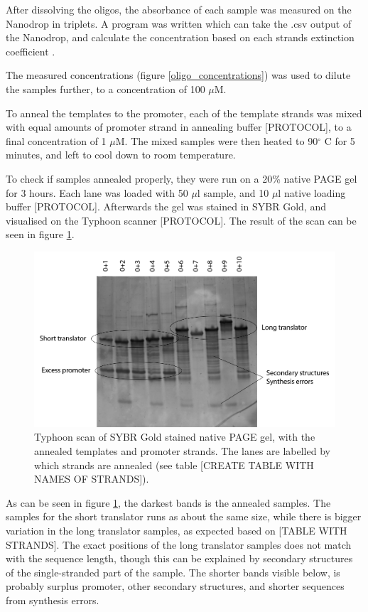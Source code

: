 After dissolving the oligos, the absorbance of each sample was measured on the Nanodrop in triplets. A program was written which can take the .csv output of the Nanodrop, and calculate the concentration based on each strands extinction coefficient \cite{nanodropimport}.

The measured concentrations (figure \ref{oligo_concentrations}) was used to dilute the samples further, to a concentration of 100 $\mu$M.

To anneal the templates to the promoter, each of the template strands was mixed with equal amounts of promoter strand in annealing buffer [PROTOCOL], to a final concentration of 1 $\mu$M. The mixed samples were then heated to 90$^\circ$ C for 5 minutes, and left to cool down to room temperature.

To check if samples annealed properly, they were run on a 20\% native PAGE gel for 3 hours. Each lane was loaded with 50 $\mu$l sample, and 10 $\mu$l native loading buffer [PROTOCOL]. Afterwards the gel was stained in SYBR Gold, and visualised on the Typhoon scanner [PROTOCOL]. The result of the scan can be seen in figure \ref{fig:promoter_annealing_gel}.

\begin{figure}[H]
\centering
\includegraphics[width=\columnwidth]{images/promoter_annealing_gel.png}
\caption{Typhoon scan of SYBR Gold stained native PAGE gel, with the annealed templates and promoter strands. The lanes are labelled by which strands are annealed (see table [CREATE TABLE WITH NAMES OF STRANDS]).}
\label{fig:promoter_annealing_gel}
\end{figure}

As can be seen in figure \ref{fig:promoter_annealing_gel}, the darkest bands is the annealed samples. The samples for the short translator runs as about the same size, while there is bigger variation in the long translator samples, as expected based on [TABLE WITH STRANDS]. The exact positions of the long translator samples does not match with the sequence length, though this can be explained by secondary structures of the single-stranded part of the sample. The shorter bands visible below, is probably surplus promoter, other secondary structures, and shorter sequences from synthesis errors.

